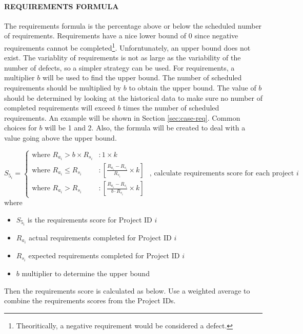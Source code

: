 \documentclass[SDSUThesis.tex]{subfiles}
\begin{document}
            \paragraph{REQUIREMENTS FORMULA}
                The requirements formula is the percentage above or below the
                scheduled number of requirements. Requirements have a nice
                lower bound of 0 since negative requirements cannot be 
                completed\footnote{Theoritically, a negative requirement would
                be considered a defect.}.  Unforntunately, an upper bound
                does not exist.  The variablity of requirements is not
                as large as the variability of the number of defects, so
                a simpler strategy can be used.  For requirements, a 
                multiplier $b$ will be used to find the upper bound. The
                number of scheduled requirements should be multiplied by
                $b$ to obtain the upper bound.  The value of $b$ should
                be determined by looking at the historical data to make sure
                no number of completed requirements will exceed $b$ times
                the number of scheduled requirements. An example will be shown
                in Section \ref{sec:case-req}. Common choices for $b$ will be 1
                and 2. Also, the formula will be
                created to deal with a value going above the upper bound.
                
                \begin{displaymath}
                   S_{5_i} = \left\{
                     \begin{array}{lr}
                       \text{where } R_{a_i} > b \times R_{s_i} & :  1 \times k \\
                       \text{where } R_{a_i} \leq R_{s_i} & : \left[ \frac{R_{a_i} - R_{s_i}}{R_{s_i}}\times k \right] \\
                       \text{where } R_{a_i} > R_{s_i}  & : \left[ \frac{R_{a_i} - R_{s_i} }{b \cdot R_{s_i}}\times k \right]
                     \end{array}
                   \right. \text{   , calculate requirements score for each project $i$}
                \end{displaymath}
                where
                \begin{itemize}
                    \item $S_{5_i}$ is the requirements score for Project ID $i$
                    \item $R_{a_i}$ actual requirements completed for Project ID $i$
                    \item $R_{s_i}$ expected requirements completed for Project ID $i$
                    \item $b$ multiplier to determine the upper bound
                \end{itemize}
                Then the requirements score is calculated as below.  
                Use a weighted average to combine the requirements scores
                from the Project IDs.
                
\end{document}

